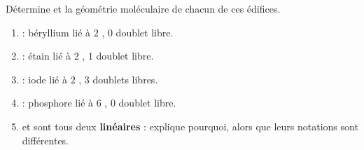 \documentclass[11pt,a4paper]{article}
\begin{document}
\begin{exo}
Détermine  et la géométrie moléculaire de chacun de ces édifices.
\begin{enumerate}[label=\alph*)]
  \item {} : béryllium lié à $2$ , $0$ doublet libre.
  \item {} : étain lié à $2$ , $1$ doublet libre.
  \item {} : iode lié à $2$ , $3$ doublets libres.
  \item {} : phosphore lié à $6$ , $0$ doublet libre.
  \item {} et  sont tous deux \textbf{linéaires} : explique pourquoi, alors que
        leurs notations  sont différentes.
\end{enumerate}
\end{exo}
\end{document}
